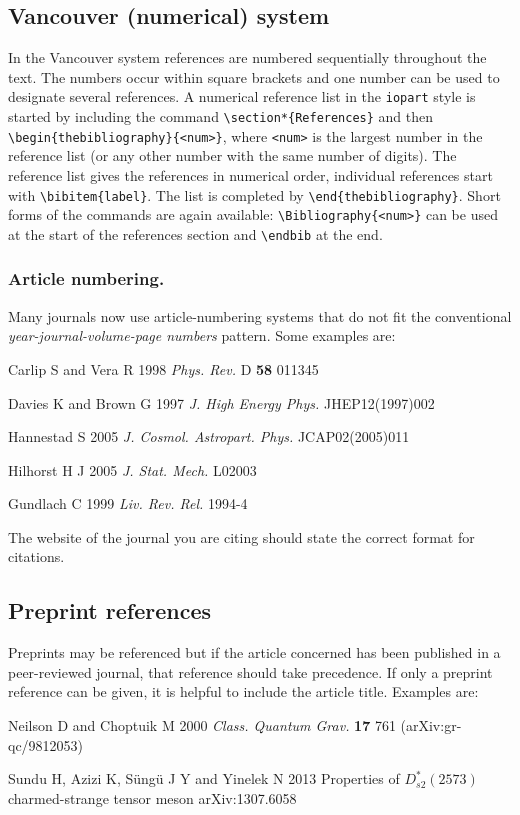 \documentclass[12pt]{iopart}
\begin{document}
\subsection{Vancouver (numerical) system}
In the Vancouver system references are numbered sequentially
throughout the text. The numbers occur within square brackets and one
number can be used to designate several references. A numerical
reference list in the \verb"iopart" style is started by including the
command \verb"\section*{References}" and then
\verb"\begin{thebibliography}{<num>}", where \verb"<num>" is the largest
number in the reference list (or any other number with the same number
of digits).  The
reference list gives the references in
numerical order, individual references start with \verb"\bibitem{label}". The list is completed by
\verb"\end{thebibliography}". Short forms of the commands are again
available: \verb"\Bibliography{<num>}" can be used at the start of the
references section and \verb"\endbib" at the end.

\subsubsection{Article numbering.}
Many journals now use article-numbering systems that do not fit the conventional {\it year-journal-volume-page numbers} pattern. Some examples are:

\item Carlip S and Vera R 1998 {\it Phys. Rev.} D {\bf 58} 011345
\item Davies K and Brown G 1997 {\it J. High Energy Phys.} JHEP12(1997)002
\item Hannestad S 2005 {\it J. Cosmol. Astropart. Phys.} JCAP02(2005)011
\item Hilhorst H J 2005 {\it J. Stat. Mech.} L02003
\item Gundlach C 1999 {\it Liv. Rev. Rel.} 1994-4
\endnumrefs

\noindent The website of the journal you are citing should state the correct format for citations.

\subsection{Preprint references}
Preprints may be referenced but if the article concerned has been published in a peer-reviewed journal, that reference should take precedence. If only a preprint reference can be given, it is helpful to include the article title. Examples are:
\vskip6pt
\item Neilson D and Choptuik M 2000 {\it Class. Quantum Grav.} {\bf 17} 761 (arXiv:gr-qc/9812053)
\item Sundu H, Azizi K, S\"ung\"u J Y and Yinelek N 2013 Properties of $D_{s2}^*(2573)$ charmed-strange tensor meson arXiv:1307.6058
\endnumrefs
\end{document}
